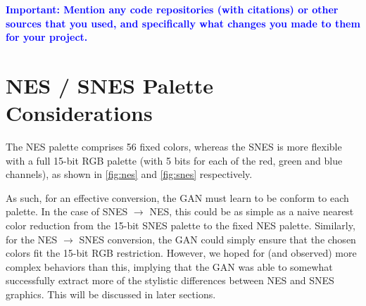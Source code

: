 \documentclass[10pt,twocolumn,letterpaper]{article}
\begin{document}
\textbf{\textcolor{blue}{Important: Mention any code repositories (with citations) or other sources that you used, and specifically what changes you made to them for your project.}}

\section{NES / SNES Palette Considerations}
The NES palette comprises 56 fixed colors, whereas the SNES is more flexible with a full 15-bit RGB palette (with 5 bits for each of the red, green and blue channels), as shown in \ref{fig:nes} and \ref{fig:snes} respectively.

As such, for an effective conversion, the GAN must learn to be conform to each palette. In the case of SNES ${\rightarrow}$ NES, this could be as simple as a naive nearest color reduction from the 15-bit SNES palette to the fixed NES palette. Similarly, for the NES ${\rightarrow}$ SNES conversion, the GAN could simply ensure that the chosen colors fit the 15-bit RGB restriction. However, we hoped for (and observed) more complex behaviors than this, implying that the GAN was able to somewhat successfully extract more of the stylistic differences between NES and SNES graphics. This will be discussed in later sections.
\end{document}
